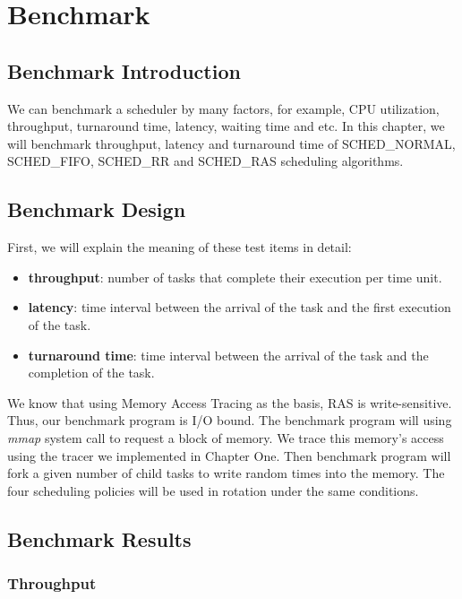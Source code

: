 
\chapter{Benchmark}

\section{Benchmark Introduction}

We can benchmark a scheduler by many factors, for example, CPU utilization, throughput, turnaround time, latency, waiting time and etc. In this chapter, we will benchmark throughput, latency and turnaround time of SCHED\_NORMAL, SCHED\_FIFO, SCHED\_RR and SCHED\_RAS scheduling algorithms. 

\section{Benchmark Design}

First, we will explain the meaning of these test items in detail:
\begin{itemize}
    \item \textbf{throughput}: number of tasks that complete their execution per time unit.
    \item \textbf{latency}: time interval between the arrival of the task and the first execution of the task.
    \item \textbf{turnaround time}: time interval between the arrival of the task and the completion of the task.
\end{itemize}

We know that using Memory Access Tracing as the basis, RAS is write-sensitive. Thus, our benchmark program is I/O bound. The benchmark program will using \textit{mmap} system call to request a block of memory. We trace this memory's access using the tracer we implemented in Chapter One. Then benchmark program will fork a given number of child tasks to write random times into the memory. The four scheduling policies will be used in rotation under the same conditions.

\section{Benchmark Results}
\subsection{Throughput}

